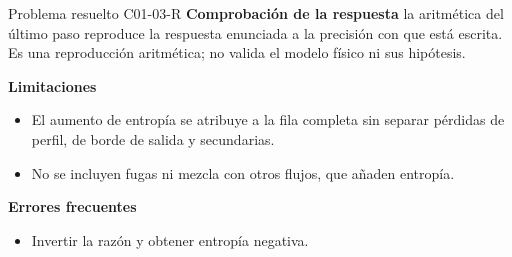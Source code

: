 \documentclass[10pt,openany]{book}
\begin{document}
\begin{studiumworked}{Problema resuelto C01-03-R}
\noindent\textbf{Comprobación de la respuesta} la aritmética del último paso reproduce la respuesta enunciada a la precisión con que está escrita. Es una reproducción aritmética; no valida el modelo físico ni sus hipótesis.

\noindent\textbf{Limitaciones}
\begin{itemize}
\item El aumento de entropía se atribuye a la fila completa sin separar pérdidas de perfil, de borde de salida y secundarias.
\item No se incluyen fugas ni mezcla con otros flujos, que añaden entropía.
\end{itemize}

\noindent\textbf{Errores frecuentes}
\begin{itemize}
\item Invertir la razón y obtener entropía negativa.
\end{itemize}
\end{studiumworked}
\end{document}
